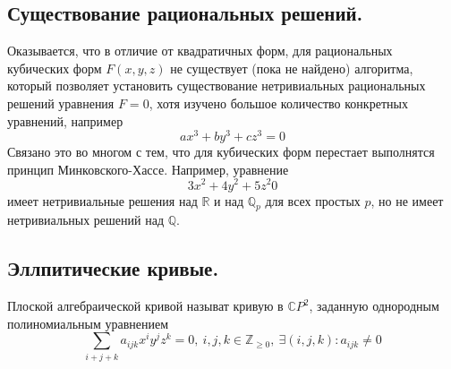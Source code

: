 \documentclass[11pt]{report}
\begin{document}
    \subsection{Существование рациональных решений.}
    Оказывается, что в отличие от квадратичных форм, для рациональных кубических форм $F(x, y, z)$ не существует (пока не найдено)
    алгоритма, который позволяет установить существование нетривиальных рациональных решений уравнения $F = 0$, хотя изучено большое количество конкретных уравнений, например
    \[ ax^3 + by^3 + cz^3 = 0 \]
    Связано это во многом с тем, что для кубических форм перестает выполнятся принцип Минковского-Хассе. Например, уравнение
    \[ 3x^2 + 4y^2 + 5z^2 0 \]
    имеет нетривиальные решения над $\mathbb{R}$ и над $\mathbb{Q}_p$ для всех простых $p$, но не имеет нетривиальных решений над $\mathbb{Q}$.
    \subsection{Эллпитические кривые.}

    \begin{definition}
        Плоской алгебраической кривой называт кривую в $\mathbb{C}P^2$, заданную однородным полиномиальным уравнением
        \[ \sum\limits_{i + j + k} a_{i j k} x^{i} y^{j} z^{k} = 0, \ i, j, k \in \mathbb{Z}_{\ge 0}, \ \exists (i, j, k)\colon a_{i j k} \neq 0 \]

    \end{definition}
\end{document}
